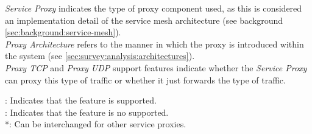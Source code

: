 \begin{table*}[t]
{\textit{Service Proxy} indicates the type of proxy component used, as this is considered an implementation detail of the service mesh architecture (see background \cref{sec:background:service-mesh}). \\
\textit{Proxy Architecture} refers to the manner in which the proxy is introduced within the system (see \cref{sec:survey:analysis:architectures}). \\
\textit{Proxy TCP} and \textit{Proxy UDP} support features indicate whether the \textit{Service Proxy} can proxy this type of traffic or whether it just forwards the type of traffic. 

\cmark: Indicates that the feature is supported. \\
\xmark: Indicates that the feature is no supported. \\
*: Can be interchanged for other service proxies.
}
\label{tab:result-proxy}
\end{table*}










